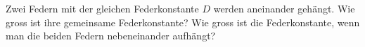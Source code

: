 Zwei Federn mit der gleichen Federkonstante $D$ werden aneinander gehängt. Wie gross ist ihre gemeinsame Federkonstante? Wie gross ist die Federkonstante, wenn man die beiden Federn nebeneinander aufhängt?
